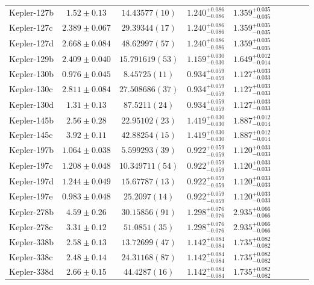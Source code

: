 \documentclass[a4paper,fleqn,usenatbib]{mnras}
\begin{document}
\begin{table*}
\begin{tabular}{lcccccccc}
Kepler-127b&	$1.52 \pm 0.13$    	&$14.43577 (10)$	&$1.240_{-0.086}^{+0.086}$	&$1.359_{-0.035}^{+0.035}$	\\
Kepler-127c&	$2.389 \pm 0.067$	&$29.39344 (17)$	&$1.240_{-0.086}^{+0.086}$	&$1.359_{-0.035}^{+0.035}$	\\
Kepler-127d&	$2.668 \pm 0.084$	&$48.62997 (57)$	&$1.240_{-0.086}^{+0.086}$	&$1.359_{-0.035}^{+0.035}$	\\
Kepler-129b&	$2.409 \pm 0.040$	&$15.791619 (53)$	&$1.159_{-0.030}^{+0.030}$	&$1.649_{-0.014}^{+0.012}$		\\
Kepler-130b&	$0.976 \pm 0.045$	&$8.45725 (11)$		&$0.934_{-0.059}^{+0.059}$	&$1.127_{-0.033}^{+0.033}$	\\
Kepler-130c&	$2.811 \pm 0.084$	&$27.508686 (37)$	&$0.934_{-0.059}^{+0.059}$	&$1.127_{-0.033}^{+0.033}$	\\
Kepler-130d&	$1.31 \pm 0.13$    	&$87.5211 (24)$		&$0.934_{-0.059}^{+0.059}$	&$1.127_{-0.033}^{+0.033}$	\\
Kepler-145b&	$2.56 \pm 0.28$    	&$22.95102 (23)$	&$1.419_{-0.030}^{+0.030}$	&$1.887_{-0.014}^{+0.012}$		\\
Kepler-145c&	$3.92 \pm 0.11$    	&$42.88254 (15)$	&$1.419_{-0.030}^{+0.030}$	&$1.887_{-0.014}^{+0.012}$		\\
Kepler-197b&	$1.064 \pm 0.038$	&$5.599293 (39)$	&$0.922_{-0.059}^{+0.059}$	&$1.120_{-0.033}^{+0.033}$	\\
Kepler-197c&	$1.208 \pm 0.048$	&$10.349711 (54)$	&$0.922_{-0.059}^{+0.059}$	&$1.120_{-0.033}^{+0.033}$	\\
Kepler-197d&	$1.244 \pm 0.049$	&$15.67787 (13)$	&$0.922_{-0.059}^{+0.059}$	&$1.120_{-0.033}^{+0.033}$	\\
Kepler-197e&	$0.983 \pm 0.048$	&$25.2097 (14)$		&$0.922_{-0.059}^{+0.059}$	&$1.120_{-0.033}^{+0.033}$	\\
Kepler-278b&	$4.59 \pm 0.26$    	&$30.15856 (91)$	&$1.298_{-0.076}^{+0.076}$	&$2.935_{-0.066}^{+0.066}$	\\
Kepler-278c&	$3.31 \pm 0.12$    	&$51.0851 (35)$		&$1.298_{-0.076}^{+0.076}$	&$2.935_{-0.066}^{+0.066}$	\\
Kepler-338b&	$2.58 \pm 0.13$    	&$13.72699 (47)$	&$1.142_{-0.084}^{+0.084}$	&$1.735_{-0.082}^{+0.082}$	\\
Kepler-338c&	$2.48 \pm 0.14$    	&$24.31168 (87)$	&$1.142_{-0.084}^{+0.084}$	&$1.735_{-0.082}^{+0.082}$	\\
Kepler-338d&	$2.66 \pm 0.15$    	&$44.4287 (16)$		&$1.142_{-0.084}^{+0.084}$	&$1.735_{-0.082}^{+0.082}$	\\

\end{tabular}
\end{table*}
\end{document}
